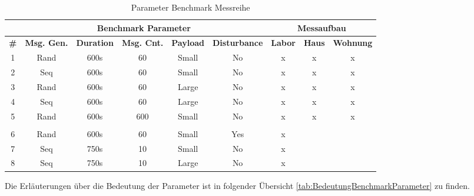 \begin{table}[h]
\centering
\begin{adjustbox}{width=1\textwidth}
\begin{tabular}{|c|c|c|c|c|c|c|c|c|} 
\cline{2-9}
\multicolumn{1}{c|}{} & \multicolumn{5}{c|}{Benchmark Parameter} & \multicolumn{3}{c|}{Messaufbau} \\ 
\hline
\textbf{\#}  & \textbf{Msg. Gen.}  & \textbf{Duration} & \textbf{Msg. Cnt.}  & \textbf{Payload }  & \textbf{Disturbance}  & \textbf{Labor}  & \textbf{Haus}  & \textbf{Wohnung}  \\ 
\hline
1 & Rand & 600s & 60 & Small & No & x & x & x \\ 
\hline
2 & Seq & 600s & 60 & Small & No & x & x & x \\ 
\hline
3 & Rand & 600s & 60 & Large & No & x & x & x \\ 
\hline
4 & Seq & 600s & 60 & Large & No & x & x & x \\ 
\hline
5 & Rand & 600s & 600 & Small & No & x & x & x \\ 
\hline
\multicolumn{1}{c}{} & \multicolumn{1}{c}{} & \multicolumn{1}{c}{} & \multicolumn{1}{c}{} & \multicolumn{1}{c}{} & \multicolumn{1}{c}{} & \multicolumn{1}{c}{} & \multicolumn{1}{c}{} & \multicolumn{1}{c}{} \\ 
\hline
6 & Rand & 600s & 60 & Small & Yes & x &  &  \\ 
\hline
7 & Seq & 750s & 10 & Small & No & x &  &  \\ 
\hline
8 & Seq & 750s & 10 & Large & No & x &  &  \\
\hline
\end{tabular}
\end{adjustbox}
\caption{Parameter Benchmark Messreihe}
\label{tab:ParameterBenchmarkMessreihe}
\end{table}

Die Erläuterungen über die Bedeutung der Parameter ist in folgender Übersicht \ref{tab:BedeutungBenchmarkParameter} zu finden. 

